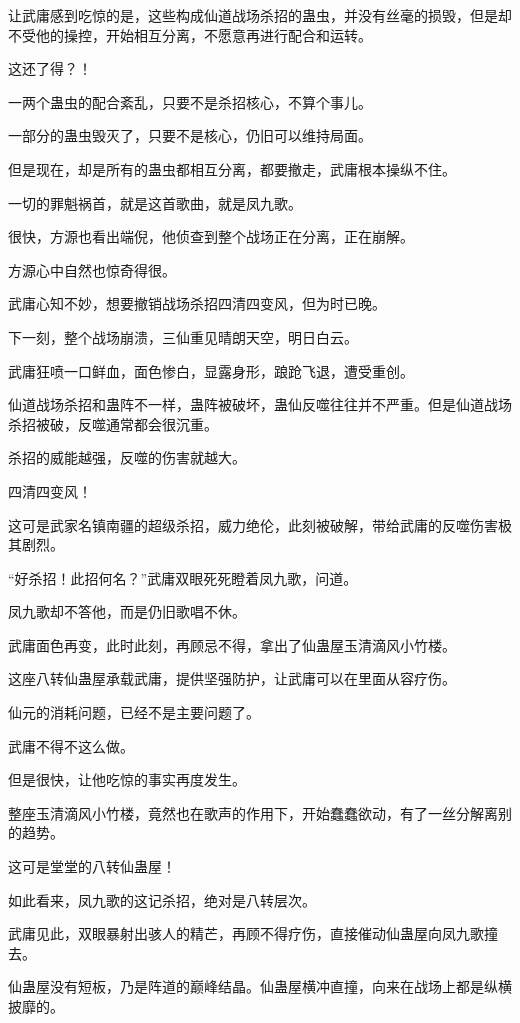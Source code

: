 \begin{this_body}
让武庸感到吃惊的是，这些构成仙道战场杀招的蛊虫，并没有丝毫的损毁，但是却不受他的操控，开始相互分离，不愿意再进行配合和运转。

这还了得？！

一两个蛊虫的配合紊乱，只要不是杀招核心，不算个事儿。

一部分的蛊虫毁灭了，只要不是核心，仍旧可以维持局面。

但是现在，却是所有的蛊虫都相互分离，都要撤走，武庸根本操纵不住。

一切的罪魁祸首，就是这首歌曲，就是凤九歌。

很快，方源也看出端倪，他侦查到整个战场正在分离，正在崩解。

方源心中自然也惊奇得很。

武庸心知不妙，想要撤销战场杀招四清四变风，但为时已晚。

下一刻，整个战场崩溃，三仙重见晴朗天空，明日白云。

武庸狂喷一口鲜血，面色惨白，显露身形，踉跄飞退，遭受重创。

仙道战场杀招和蛊阵不一样，蛊阵被破坏，蛊仙反噬往往并不严重。但是仙道战场杀招被破，反噬通常都会很沉重。

杀招的威能越强，反噬的伤害就越大。

四清四变风！

这可是武家名镇南疆的超级杀招，威力绝伦，此刻被破解，带给武庸的反噬伤害极其剧烈。

“好杀招！此招何名？”武庸双眼死死瞪着凤九歌，问道。

凤九歌却不答他，而是仍旧歌唱不休。

武庸面色再变，此时此刻，再顾忌不得，拿出了仙蛊屋玉清滴风小竹楼。

这座八转仙蛊屋承载武庸，提供坚强防护，让武庸可以在里面从容疗伤。

仙元的消耗问题，已经不是主要问题了。

武庸不得不这么做。

但是很快，让他吃惊的事实再度发生。

整座玉清滴风小竹楼，竟然也在歌声的作用下，开始蠢蠢欲动，有了一丝分解离别的趋势。

这可是堂堂的八转仙蛊屋！

如此看来，凤九歌的这记杀招，绝对是八转层次。

武庸见此，双眼暴射出骇人的精芒，再顾不得疗伤，直接催动仙蛊屋向凤九歌撞去。

仙蛊屋没有短板，乃是阵道的巅峰结晶。仙蛊屋横冲直撞，向来在战场上都是纵横披靡的。


\end{this_body}
